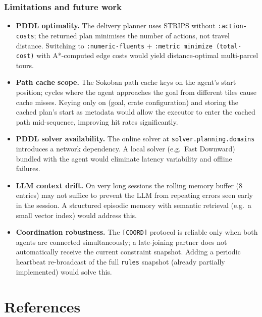 \documentclass[10pt,a4paper,twocolumn]{article}
\begin{document}
\subsubsection*{Limitations and future work}
\begin{itemize}[noitemsep]
  \item \textbf{PDDL optimality.}  The delivery planner uses STRIPS without
        \texttt{:action-costs}; the returned plan minimises the number of actions,
        not travel distance.  Switching to \texttt{:numeric-fluents} +
        \texttt{:metric minimize (total-cost)} with A*-computed edge costs would
        yield distance-optimal multi-parcel tours.
  \item \textbf{Path cache scope.}  The Sokoban path cache keys on the agent's
        start position; cycles where the agent approaches the goal from different
        tiles cause cache misses.  Keying only on (goal, crate configuration) and
        storing the cached plan's start as metadata would allow the executor to
        enter the cached path mid-sequence, improving hit rates significantly.
  \item \textbf{PDDL solver availability.}  The online solver at
        \texttt{solver.planning.domains} introduces a network dependency.  A
        local solver (e.g.\ Fast Downward) bundled with the agent would
        eliminate latency variability and offline failures.
  \item \textbf{LLM context drift.}  On very long sessions the rolling memory
        buffer (8 entries) may not suffice to prevent the LLM from repeating
        errors seen early in the session.  A structured episodic memory with
        semantic retrieval (e.g.\ a small vector index) would address this.
  \item \textbf{Coordination robustness.}  The \texttt{[COORD]} protocol is
        reliable only when both agents are connected simultaneously; a late-joining
        partner does not automatically receive the current constraint snapshot.
        Adding a periodic heartbeat re-broadcast of the full \texttt{rules}
        snapshot (already partially implemented) would solve this.
\end{itemize}

\section*{References}
\end{document}
